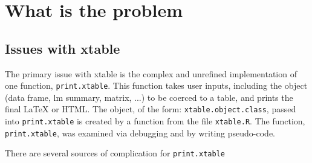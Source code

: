 \documentclass{memoir}\usepackage[]{graphicx}\usepackage[]{color}
\newcommand{\pkg}[1]{{\fontseries{b}\selectfont #1}}
\let\code=\texttt
\newcommand{\latex}{\LaTeX\xspace}
\begin{document}
\newpage

\chapter{What is the problem}

\section{Issues with \pkg{xtable}}
\label{sec:issues}

The primary issue with \pkg{xtable} is the complex and unrefined implementation of one function, \code{print.xtable}. This function takes user inputs, including the object (data frame, lm summary, matrix, ...) to be coerced to a table, and prints the final \latex or HTML. The object, of the form: \code{xtable.object.class}, passed into \code{print.xtable} is created by a function from the file \code{xtable.R}. The function, \code{print.xtable}, was examined via debugging and by writing pseudo-code. 

\vspace{4mm}

There are several sources of complication for \code{print.xtable}
\end{document}
